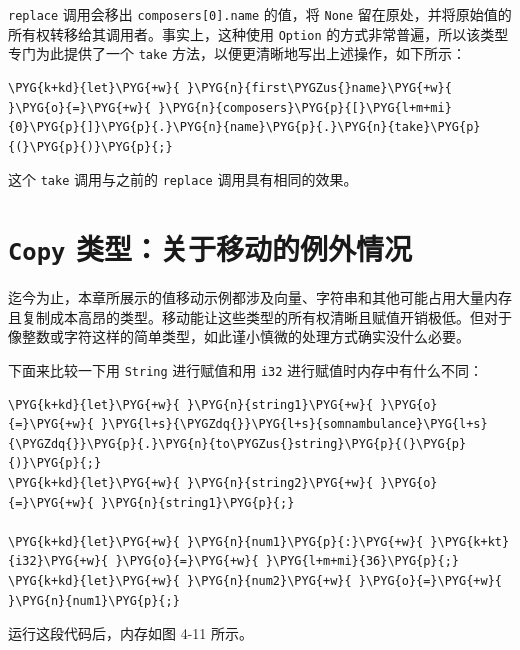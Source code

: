\texttt{replace} 调用会移出 \texttt{composers[0].name} 的值，将 \texttt{None} 留在原处，并将原始值的所有权转移给其调用者。事实上，这种使用 \texttt{Option} 的方式非常普遍，所以该类型专门为此提供了一个 \texttt{take} 方法，以便更清晰地写出上述操作，如下所示：

\begin{Verbatim}[commandchars=\\\{\},breaklines=true,breakanywhere=true,fontsize=\codefont,xleftmargin=17bp]
\PYG{k+kd}{let}\PYG{+w}{ }\PYG{n}{first\PYGZus{}name}\PYG{+w}{ }\PYG{o}{=}\PYG{+w}{ }\PYG{n}{composers}\PYG{p}{[}\PYG{l+m+mi}{0}\PYG{p}{]}\PYG{p}{.}\PYG{n}{name}\PYG{p}{.}\PYG{n}{take}\PYG{p}{(}\PYG{p}{)}\PYG{p}{;}
\end{Verbatim}

这个 \texttt{take} 调用与之前的 \texttt{replace} 调用具有相同的效果。

\section{\texttt{Copy} 类型：关于移动的例外情况}

迄今为止，本章所展示的值移动示例都涉及向量、字符串和其他可能占用大量内存且复制成本高昂的类型。移动能让这些类型的所有权清晰且赋值开销极低。但对于像整数或字符这样的简单类型，如此谨小慎微的处理方式确实没什么必要。

下面来比较一下用 \texttt{String} 进行赋值和用 \texttt{i32} 进行赋值时内存中有什么不同：

\begin{Verbatim}[commandchars=\\\{\},breaklines=true,breakanywhere=true,fontsize=\codefont,xleftmargin=17bp]
\PYG{k+kd}{let}\PYG{+w}{ }\PYG{n}{string1}\PYG{+w}{ }\PYG{o}{=}\PYG{+w}{ }\PYG{l+s}{\PYGZdq{}}\PYG{l+s}{somnambulance}\PYG{l+s}{\PYGZdq{}}\PYG{p}{.}\PYG{n}{to\PYGZus{}string}\PYG{p}{(}\PYG{p}{)}\PYG{p}{;}
\PYG{k+kd}{let}\PYG{+w}{ }\PYG{n}{string2}\PYG{+w}{ }\PYG{o}{=}\PYG{+w}{ }\PYG{n}{string1}\PYG{p}{;}

\PYG{k+kd}{let}\PYG{+w}{ }\PYG{n}{num1}\PYG{p}{:}\PYG{+w}{ }\PYG{k+kt}{i32}\PYG{+w}{ }\PYG{o}{=}\PYG{+w}{ }\PYG{l+m+mi}{36}\PYG{p}{;}
\PYG{k+kd}{let}\PYG{+w}{ }\PYG{n}{num2}\PYG{+w}{ }\PYG{o}{=}\PYG{+w}{ }\PYG{n}{num1}\PYG{p}{;}
\end{Verbatim}

运行这段代码后，内存如图 4-11 所示。


